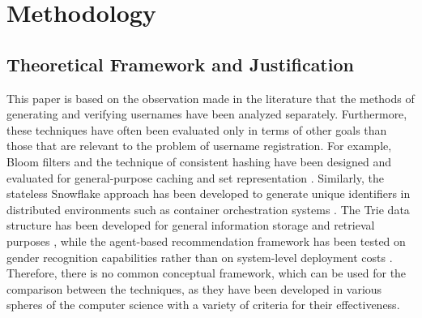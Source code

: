 \documentclass[conference]{IEEEtran}
\begin{document}
\section{Methodology}

\subsection{Theoretical Framework and Justification}
This paper is based on the observation made in the literature that the methods of generating and verifying usernames have been analyzed separately. Furthermore, these techniques have often been evaluated only in terms of other goals than those that are relevant to the problem of username registration. For example, Bloom filters and the technique of consistent hashing have been designed and evaluated for general-purpose caching and set representation \cite{b1,b2,b3}. Similarly, the stateless Snowflake approach has been developed to generate unique identifiers in distributed environments such as container orchestration systems \cite{b4}. The Trie data structure has been developed for general information storage and retrieval purposes \cite{b5}, while the agent-based recommendation framework has been tested on gender recognition capabilities rather than on system-level deployment costs \cite{b6}. Therefore, there is no common conceptual framework, which can be used for the comparison between the techniques, as they have been developed in various spheres of the computer science with a variety of criteria for their effectiveness.
\end{document}
